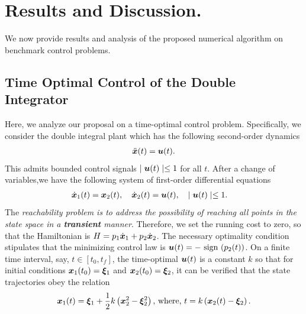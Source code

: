 \section{Results and Discussion.}
\label{sec:results}
We now provide results and analysis of the proposed numerical algorithm on benchmark control problems.

\subsection{Time Optimal Control of the Double Integrator}
%
Here, we analyze our proposal on a time-optimal control problem. Specifically, we consider the  double integral plant which has the following second-order dynamics
%
\begin{align}
	\ddot{\state}(t) = \control(t).
	\label{eq:double_integ}
\end{align}
%
This admits bounded control signals $\mid \bm{u}(t) \mid \le 1$ for all $t$. After a change of variables,we have the following system of first-order differential equations
%
\begin{align}
	\dot{\state}_1(t) &= \state_2(t),\quad
	\dot{\state}_2(t) = \control(t), \quad \mid \control(t) \mid \le 1. \nonumber
	\label{eq:double_integ_first_ord}
\end{align}
%
The \textit{reachability problem is to address the possibility of reaching all points in the state space in a \textbf{transient} manner}. %
Therefore, we set the running cost to zero, so that the Hamiltonian is $H = p_1 \dot{\bm{x}}_1 + p_2 \dot{\bm{x}}_2$. The necessary optimality condition stipulates that the minimizing control law is $\bm{u}(t) = -\text{ sign }(p_2(t))$. On a finite time interval, say, $t \in [t_0, t_f]$, the time-optimal $\bm{u}(t)$ is a constant $k$ so that for initial conditions $\bm{x}_1(t_0) = \bm{\xi}_1$ and $\bm{x}_2(t_0) = \bm{\xi}_2$, it can be  verified that the state trajectories obey the relation
%
\begin{align}
	\bm{x}_1(t) = \bm{\xi}_1 + \frac{1}{2} k  \left(\bm{x}_2^2 - \bm{\xi}_2^2\right), \,\text{where, } t = k \left(\bm{x}_2(t) - \bm{\xi}_2\right).
\end{align}

